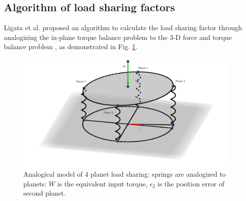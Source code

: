 \documentclass[a4paper,fleqn]{cas-sc}%
\begin{document}
\subsection{Algorithm of load sharing factors\label{sec:algorithm_load_sharing}}
\par Ligata et al. proposed an algorithm to calculate the load sharing factor through analogizing the in-plane torque balance problem to the 3-D force and torque balance problem \cite{Ligata2009}, as demonstrated in Fig. \ref{fig:analogical_model}.
\begin{figure}[pos=htbp]
    \centering
    \includegraphics[scale=0.2]{Analogical_planet_load.png}
    \caption{Analogical model of 4 planet load sharing: springs are analogized to planets: $W$ is the equivalent input torque, $\epsilon_2$ is the position error of second planet.}
    \label{fig:analogical_model}
\end{figure}
\end{document}
